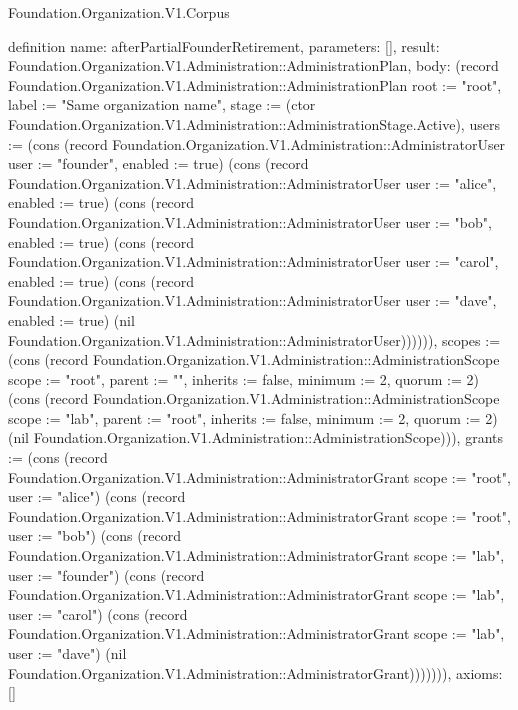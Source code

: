 \begin{lexlean}{Foundation.Organization.V1.Corpus}
\begin{semanticmodule}
definition{
  name: afterPartialFounderRetirement,
  parameters: [],
  result: Foundation.Organization.V1.Administration::AdministrationPlan,
  body: (record Foundation.Organization.V1.Administration::AdministrationPlan {root := "root", label := "Same organization name", stage := (ctor Foundation.Organization.V1.Administration::AdministrationStage.Active), users := (cons (record Foundation.Organization.V1.Administration::AdministratorUser {user := "founder", enabled := true}) (cons (record Foundation.Organization.V1.Administration::AdministratorUser {user := "alice", enabled := true}) (cons (record Foundation.Organization.V1.Administration::AdministratorUser {user := "bob", enabled := true}) (cons (record Foundation.Organization.V1.Administration::AdministratorUser {user := "carol", enabled := true}) (cons (record Foundation.Organization.V1.Administration::AdministratorUser {user := "dave", enabled := true}) (nil Foundation.Organization.V1.Administration::AdministratorUser)))))), scopes := (cons (record Foundation.Organization.V1.Administration::AdministrationScope {scope := "root", parent := "", inherits := false, minimum := 2, quorum := 2}) (cons (record Foundation.Organization.V1.Administration::AdministrationScope {scope := "lab", parent := "root", inherits := false, minimum := 2, quorum := 2}) (nil Foundation.Organization.V1.Administration::AdministrationScope))), grants := (cons (record Foundation.Organization.V1.Administration::AdministratorGrant {scope := "root", user := "alice"}) (cons (record Foundation.Organization.V1.Administration::AdministratorGrant {scope := "root", user := "bob"}) (cons (record Foundation.Organization.V1.Administration::AdministratorGrant {scope := "lab", user := "founder"}) (cons (record Foundation.Organization.V1.Administration::AdministratorGrant {scope := "lab", user := "carol"}) (cons (record Foundation.Organization.V1.Administration::AdministratorGrant {scope := "lab", user := "dave"}) (nil Foundation.Organization.V1.Administration::AdministratorGrant))))))}),
  axioms: []
}


\end{semanticmodule}
\end{lexlean}
